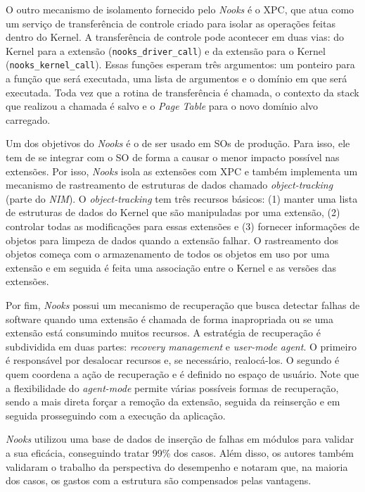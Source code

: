 O outro mecanismo de isolamento fornecido pelo \emph{Nooks} é o XPC, que atua
como um serviço de transferência de controle criado para isolar as operações
feitas dentro do Kernel. A transferência de controle pode acontecer em duas
vias: do Kernel para a extensão (\texttt{nooks\_driver\_call}) e da extensão
para o Kernel (\texttt{nooks\_kernel\_call}). Essas funções esperam
três argumentos: um ponteiro para a função que será executada, uma lista de
argumentos e o domínio em que será executada. Toda vez que a rotina de
transferência é chamada, o contexto da stack que realizou a chamada é salvo e o
\emph{Page Table} para o novo domínio alvo carregado.

Um dos objetivos do \emph{Nooks} é o de ser usado em SOs de produção. Para isso,
ele tem de se integrar com o SO de forma a causar o menor impacto possível
nas extensões. Por isso, \emph{Nooks} isola as extensões com XPC e também
implementa um mecanismo de rastreamento de estruturas de dados chamado
\emph{object-tracking} (parte do \emph{NIM}). O \emph{object-tracking} tem três
recursos básicos: (1) manter uma lista de estruturas de dados do Kernel que são
manipuladas por uma extensão, (2) controlar todas as modificações para essas
extensões e (3) fornecer informações de objetos para limpeza de dados quando a
extensão falhar. O rastreamento dos objetos começa com o armazenamento de todos
os objetos em uso por uma extensão e em seguida é feita uma associação entre o
Kernel e as versões das extensões.

Por fim, \emph{Nooks} possui um mecanismo de recuperação que busca detectar
falhas de software quando uma extensão é chamada de forma inapropriada ou se
uma extensão está consumindo muitos recursos. A estratégia de recuperação é
subdividida em duas partes: \emph{recovery management} e \emph{user-mode
agent}. O primeiro é responsável por desalocar recursos e, se necessário,
realocá-los. O segundo é quem coordena a ação de recuperação e
é definido no espaço de usuário. Note que a flexibilidade do \emph{agent-mode}
permite várias possíveis formas de recuperação, sendo a mais direta forçar a
remoção da extensão, seguida da reinserção e em seguida prosseguindo com a
execução da aplicação.

\emph{Nooks} utilizou uma base de dados de inserção de falhas em módulos para
validar a sua eficácia, conseguindo tratar 99\% dos casos. Além disso, os
autores também validaram o trabalho da perspectiva do desempenho e notaram que,
na maioria dos casos, os gastos com a estrutura são compensados pelas vantagens.

